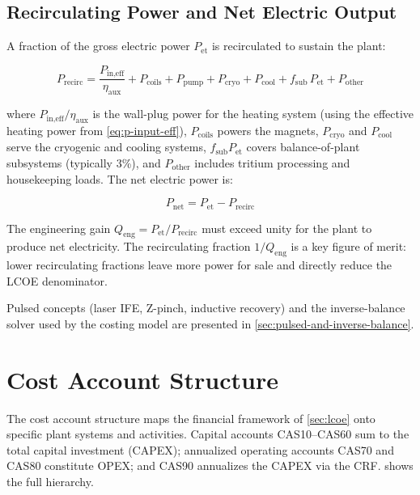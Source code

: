 \documentclass{article}
\begin{document}
\subsection{Recirculating Power and Net Electric Output}

A fraction of the gross electric power $P_{\text{et}}$ is recirculated
to sustain the plant:

\begin{equation}
\label{eq:p-recirc}
P_{\text{recirc}} = \frac{P_{\text{in,eff}}}{\eta_{\text{aux}}}
  + P_{\text{coils}} + P_{\text{pump}} + P_{\text{cryo}}
  + P_{\text{cool}} + f_{\text{sub}} \, P_{\text{et}}
  + P_{\text{other}}
\end{equation}

\noindent where $P_{\text{in,eff}}/\eta_{\text{aux}}$ is the wall-plug
power for the heating system (using the effective heating power from
\cref{eq:p-input-eff}), $P_{\text{coils}}$ powers the magnets,
$P_{\text{cryo}}$ and $P_{\text{cool}}$ serve the cryogenic and cooling
systems, $f_{\text{sub}} P_{\text{et}}$ covers balance-of-plant
subsystems (typically 3\%), and $P_{\text{other}}$ includes tritium
processing and housekeeping loads. The net electric power is:

\begin{equation}
\label{eq:p-net}
P_{\text{net}} = P_{\text{et}} - P_{\text{recirc}}
\end{equation}

\noindent The engineering gain $Q_{\text{eng}} = P_{\text{et}} /
P_{\text{recirc}}$ must exceed unity for the plant to produce net
electricity. The recirculating fraction
$1/Q_{\text{eng}}$ is a key figure of merit: lower recirculating
fractions leave more power for sale and directly reduce the LCOE
denominator.

Pulsed concepts (laser IFE, Z-pinch, inductive recovery) and the
inverse-balance solver used by the costing model are presented in
\cref{sec:pulsed-and-inverse-balance}.


\section{Cost Account Structure}
\label{sec:cas}

The cost account structure maps the financial framework of
\cref{sec:lcoe} onto specific plant systems and activities. Capital
accounts CAS10--CAS60 sum to the total capital investment (CAPEX);
annualized operating accounts CAS70 and CAS80 constitute OPEX; and
CAS90 annualizes the CAPEX via the CRF. 
shows the full hierarchy.
\end{document}
